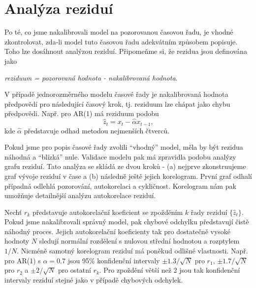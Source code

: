 \section{Analýza reziduí}

Po té, co jsme nakalibrovali model na pozorovanou časovou řadu, je vhodné zkontrolovat, zda-li model tuto časovou řadu adekvátním způsobem popisuje. Toho lze dosáhnout analýzou reziduí. Připomeňme si, že rezidua jsou definována jako
\begin{center}
\textit{reziduum = pozorovaná hodnota - nakalibrovaná hodnota}.
\end{center}
V případě jednorozměrného modelu časové řady je nakalibrovaná hodnota předpovědí pro následující časový krok, tj. reziduum lze chápat jako chybu předpovědi. Např. pro AR(1) má reziduum podobu
\begin{equation}
\hat{z}_t = x_t  - \hat{\alpha} x_{t - 1},
\end{equation}
kde $\hat{\alpha}$ představuje odhad metodou nejmenších čtverců.

Pokud jsme pro popis časové řady zvolili ``vhodný'' model, měla by být rezidua náhodná a ``blízká'' nule. Validace modelu pak má zpravidla podobu analýzy grafu reziduí. Tato analýza se skládá ze dvou kroků - (a) nejprve zkonstruujeme graf vývoje reziduí v čase a (b) následně ještě jejich korelogram. První graf odhalí případná odlehlá pozorování, autokorelaci a cykličnost. Korelogram nám pak umožňuje detailnější analýzu autokorelace reziduí.

Nechť $r_k$ představuje autokorelační koeficient se zpožděním $k$ řady reziduí $\{\hat{z}_t\}$. Pokud jsme nakalibrovali správný model, pak chybové odchylku představují čistě náhodný proces.  Jejich autokorelační koeficienty tak pro dostatečně vysoké hodnoty $N$ sledují normální rozdělení s nulovou střední hodnotou a rozptylem $1/N$. Nicméně samotný korelogram reziduí má poněkud odlišné vlastnosti. Např. pro AR(1) s $\alpha = 0.7$ jsou 95\% konfidenční intervaly $\pm 1.3 / \sqrt{N}$ pro $r_1$, $\pm 1.7/ \sqrt{N}$ pro $r_2$ a $\pm 2/ \sqrt{N}$ pro ostatní $r_k$. Pro zpoždění větší než 2 jsou tak konfidenční intervaly reziduí stejné jako v případě chybových odchylek.

